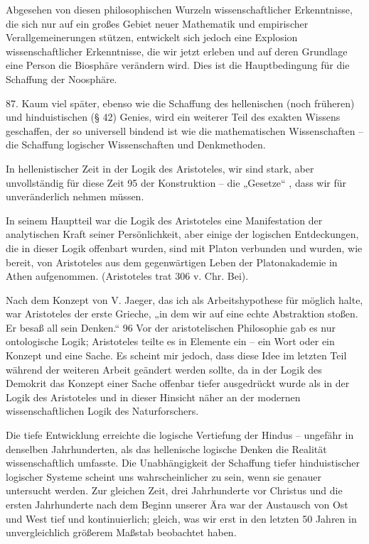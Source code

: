 \documentclass[11pt,a4paper]{book}
\begin{document}
Abgesehen von diesen philosophischen Wurzeln wissenschaftlicher Erkenntnisse, die sich nur auf ein großes Gebiet neuer Mathematik und empirischer Verallgemeinerungen stützen, entwickelt sich jedoch eine Explosion wissenschaftlicher Erkenntnisse, die wir jetzt erleben und auf deren Grundlage eine Person die Biosphäre verändern wird. Dies ist die Hauptbedingung für die Schaffung der Noosphäre.



87. Kaum viel später, ebenso wie die Schaffung des hellenischen (noch früheren) und hinduistischen (§ 42) Genies, wird ein weiterer Teil des exakten Wissens geschaffen, der so universell bindend ist wie die mathematischen Wissenschaften -- die Schaffung logischer Wissenschaften und Denkmethoden.



In hellenistischer Zeit in der Logik des Aristoteles, wir sind stark, aber unvollständig für diese Zeit 95 der Konstruktion -- die „Gesetze“ , dass wir für unveränderlich nehmen müssen.



In seinem Hauptteil war die Logik des Aristoteles eine Manifestation der analytischen Kraft seiner Persönlichkeit, aber einige der logischen Entdeckungen, die in dieser Logik offenbart wurden, sind mit Platon verbunden und wurden, wie bereit, von Aristoteles aus dem gegenwärtigen Leben der Platonakademie in Athen aufgenommen. (Aristoteles trat 306 v. Chr. Bei).



Nach dem Konzept von V. Jaeger, das ich als Arbeitshypothese für möglich halte, war Aristoteles der erste Grieche, „in dem wir auf eine echte Abstraktion stoßen. Er besaß all sein Denken.“ 96 Vor der aristotelischen Philosophie gab es nur ontologische Logik; Aristoteles teilte es in Elemente ein -- ein Wort oder ein Konzept und eine Sache. Es scheint mir jedoch, dass diese Idee im letzten Teil während der weiteren Arbeit geändert werden sollte, da in der Logik des Demokrit das Konzept einer Sache offenbar tiefer ausgedrückt wurde als in der Logik des Aristoteles und in dieser Hinsicht näher an der modernen wissenschaftlichen Logik des Naturforschers.



Die tiefe Entwicklung erreichte die logische Vertiefung der Hindus -- ungefähr in denselben Jahrhunderten, als das hellenische logische Denken die Realität wissenschaftlich umfasste. Die Unabhängigkeit der Schaffung tiefer hinduistischer logischer Systeme scheint uns wahrscheinlicher zu sein, wenn sie genauer untersucht werden. Zur gleichen Zeit, drei Jahrhunderte vor Christus und die ersten Jahrhunderte nach dem Beginn unserer Ära war der Austausch von Ost und West tief und kontinuierlich; gleich, was wir erst in den letzten 50 Jahren in unvergleichlich größerem Maßstab beobachtet haben.
\end{document}
